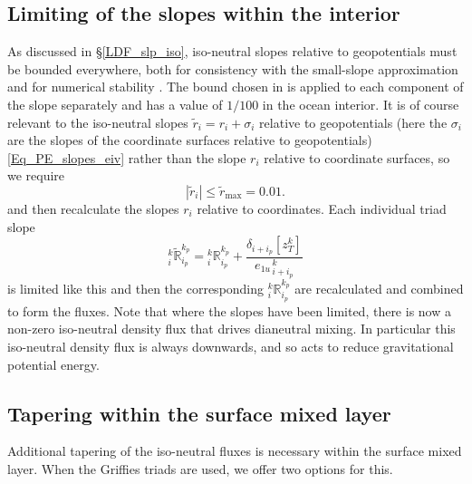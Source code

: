 \documentclass[NEMO_book]{subfiles}
\begin{document}
\subsection{ Limiting of the slopes within the interior}\label{sec:triad:limit}
As discussed in \S\ref{LDF_slp_iso}, iso-neutral slopes relative to
geopotentials must be bounded everywhere, both for consistency with the small-slope
approximation and for numerical stability \citep{Cox1987,
  Griffies_Bk04}. The bound chosen in \NEMO is applied to each
component of the slope separately and has a value of $1/100$ in the ocean interior.
It is of course relevant to the iso-neutral slopes $\tilde{r}_i=r_i+\sigma_i$ relative to
geopotentials (here the $\sigma_i$ are the slopes of the coordinate surfaces relative to
geopotentials) \eqref{Eq_PE_slopes_eiv} rather than the slope $r_i$ relative to coordinate
surfaces, so we require
\begin{equation*}
  |\tilde{r}_i|\leq \tilde{r}_\mathrm{max}=0.01.
\end{equation*}
and then recalculate the slopes $r_i$ relative to coordinates.
Each individual triad slope
 \begin{equation}
   \label{eq:triad:Rtilde}
_i^k\tilde{\mathbb{R}}_{i_p}^{k_p} = {}_i^k\mathbb{R}_{i_p}^{k_p}  + \frac{\delta_{i+i_p}[z_T^k]}{{e_{1u}}_{\,i + i_p}^{\,k}}
 \end{equation}
is limited like this and then the corresponding
$_i^k\mathbb{R}_{i_p}^{k_p} $ are recalculated and combined to form the fluxes.
Note that where the slopes have been limited, there is now a non-zero
iso-neutral density flux that drives dianeutral mixing.  In particular this iso-neutral density flux
is always downwards, and so acts to reduce gravitational potential energy.
\subsection{Tapering within the surface mixed layer}\label{sec:triad:taper}

Additional tapering of the iso-neutral fluxes is necessary within the
surface mixed layer. When the Griffies triads are used, we offer two
options for this.
\end{document}
